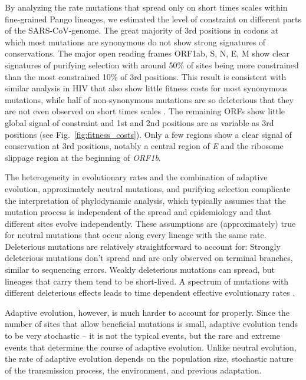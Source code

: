 \documentclass[aps,rmp, twocolumn]{revtex4}
\begin{document}
By analyzing the rate mutations that spread only on short times scales within fine-grained Pango lineages, we estimated the level of constraint on different parts of the SARS-CoV-genome.
The great majority of 3rd positions in codons at which  most mutations are synonymous do not show strong signatures of conservations.
The major open reading frames ORF1ab, S, N, E, M show clear signatures of purifying selection with around 50\% of sites being more constrained than the most constrained 10\% of 3rd positions.
This result is consistent with similar analysis in HIV that also show little fitness costs for most synonymous mutations, while half of non-synonymous mutations are so deleterious that they are not even observed on short times scales \citep{zanini_vivo_2017}.
The remaining ORFs show little global signal of constraint and 1st and 2nd positions are as variable as 3rd positions (see Fig.~\ref{fig:fitness_costs}).
Only a few regions show a clear signal of conservation at 3rd positions, notably a central region of \emph{E} and the ribosome slippage region at the beginning of \emph{ORF1b}.

The heterogeneity in evolutionary rates and the combination of adaptive evolution, approximately neutral mutations, and purifying selection complicate the interpretation of phylodynamic analysis, which typically assumes that the mutation process is independent of the spread and epidemiology and that different sites evolve independently.
These assumptions are (approximately) true for neutral mutations that occur along every lineage with the same rate.
Deleterious mutations are relatively straightforward to account for: Strongly deleterious mutations don't spread and are only observed on terminal branches, similar to sequencing errors.
Weakly deleterious mutations can spread, but lineages that carry them tend to be short-lived.
A spectrum of mutations with different deleterious effects leads to time dependent effective evolutionary rates \citep{wertheim_purifying_2011}.

Adaptive evolution, however, is much harder to account for properly.
Since the number of sites that allow beneficial mutations is small, adaptive evolution tends to be very stochastic -- it is not the typical events, but the rare and extreme events that determine the course of adaptive evolution.
Unlike neutral evolution, the rate of adaptive evolution depends on the population size, stochastic nature of the transmission process, the environment, and previous adaptation.





\onecolumngrid

% 
\end{document}
